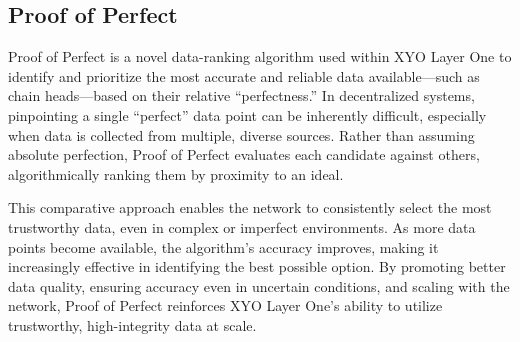 \documentclass{article}
\begin{document}
\subsection{Proof of Perfect}
Proof of Perfect is a novel data-ranking algorithm used within XYO Layer One to identify and prioritize the most accurate and reliable data available—such as chain heads—based on their relative “perfectness.” In decentralized systems, pinpointing a single “perfect” data point can be inherently difficult, especially when data is collected from multiple, diverse sources. Rather than assuming absolute perfection, Proof of Perfect evaluates each candidate against others, algorithmically ranking them by proximity to an ideal.

This comparative approach enables the network to consistently select the most trustworthy data, even in complex or imperfect environments. As more data points become available, the algorithm's accuracy improves, making it increasingly effective in identifying the best possible option. By promoting better data quality, ensuring accuracy even in uncertain conditions, and scaling with the network, Proof of Perfect reinforces XYO Layer One's ability to utilize trustworthy, high-integrity data at scale.
\end{document}
